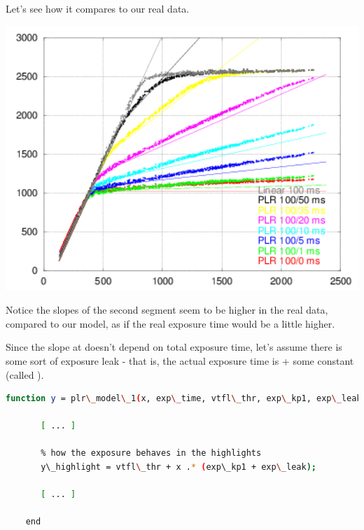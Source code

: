Let's see how it compares to our real data. \\

\begin{center}
\includegraphics[height=10cm]{images/100-x-32-plr-vs-30ms-lin-model0}
\end{center}

Notice the slopes of the second segment seem to be higher in the real data, compared to our model, as if the real exposure time would be a little higher.

Since the slope at  doesn't depend on total exposure time, let's assume there is some sort of exposure leak - that is, the actual exposure time is  + some constant (called  ). 


\begin{lstlisting}[language=bash,morekeywords=$,keywordstyle=\bfseries,frame=none,xleftmargin=.25in,belowskip=2em, aboveskip=2em]
    function y = plr\_model\_1(x, exp\_time, vtfl\_thr, exp\_kp1, exp\_leak)
      
       [ ... ]  
      
       % how the exposure behaves in the highlights
       y\_highlight = vtfl\_thr + x .* (exp\_kp1 + exp\_leak);
      
       [ ... ]  
      
    end
\end{lstlisting}

